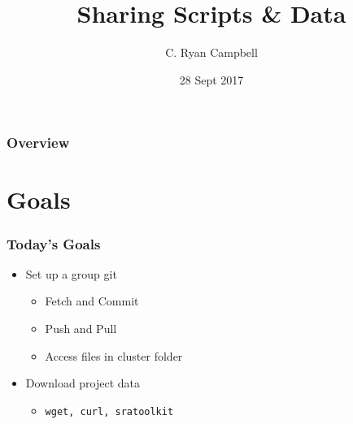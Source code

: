 \documentclass[14pt]{beamer}
\title[Git and SRA]{Sharing Scripts \& Data} %
\author{C. Ryan Campbell} %
\institute[Duke] %
{
Duke University \\ %
\medskip
\textit{c.ryan.campbell@duke.edu} %
}
\date{28 Sept 2017} %
\begin{document}
\begin{frame}
\titlepage %
\end{frame}

\begin{frame}
\frametitle{Overview} %
\tableofcontents %
\end{frame}


\section{Goals} %

\begin{frame}
\frametitle{Today's Goals}
\begin{itemize}
	\item<+-> Set up a group git
	\begin{itemize}
		\item<+-> Fetch and Commit
		\item<+-> Push and Pull
		\item<+-> Access files in cluster folder 
	\end{itemize}
	\item<+-> Download project data
	\begin{itemize}
		\item<+-> \texttt{wget, curl, sratoolkit}
	\end{itemize}
\end{itemize}
\end{frame}
\end{document}
